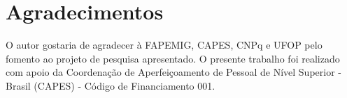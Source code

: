 \chapter*{Agradecimentos}



O autor gostaria de agradecer à FAPEMIG, CAPES, CNPq e UFOP pelo fomento ao projeto 
de pesquisa apresentado. O presente trabalho foi realizado com apoio da Coordenação 
de Aperfeiçoamento de Pessoal de Nível Superior - Brasil (CAPES) - Código de Financiamento 001.


